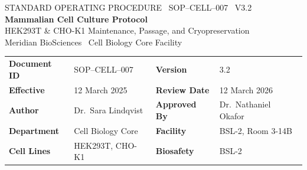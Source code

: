 
\thispagestyle{empty}


\vspace*{8mm}

\begin{center}
  {\fontsize{9}{11}\selectfont\color{white}\MakeUppercase{%
    Standard Operating Procedure \textbullet\ SOP--CELL--007 \textbullet\ v3.2%
  }}\\[6pt]
  {\fontsize{26}{30}\bfseries\color{white}
    Mammalian Cell Culture Protocol}\\[4pt]
  {\fontsize{13}{16}\color{white!85}
    HEK293T \&{} CHO-K1 Maintenance, Passage, and Cryopreservation}\\[8pt]
  {\fontsize{9}{11}\color{white!70}
    Meridian BioSciences \textbullet\ Cell Biology Core Facility}
\end{center}

\vspace{30mm}

\begin{tcolorbox}[infobox, title={}]
\renewcommand{\arraystretch}{1.35}
\begin{tabularx}{\linewidth}{L{3.2cm} X L{3.2cm} X}
  \textbf{Document ID}  & SOP--CELL--007        &
  \textbf{Version}      & 3.2 \\
  \textbf{Effective}    & 12 March 2025         &
  \textbf{Review Date}  & 12 March 2026 \\
  \textbf{Author}       & Dr.\ Sara Lindqvist   &
  \textbf{Approved By}  & Dr.\ Nathaniel Okafor \\
  \textbf{Department}   & Cell Biology Core     &
  \textbf{Facility}     & BSL-2, Room 3-14B \\
  \textbf{Cell Lines}   & HEK293T, CHO-K1       &
  \textbf{Biosafety}    & BSL-2 \\
\end{tabularx}
\end{tcolorbox}

